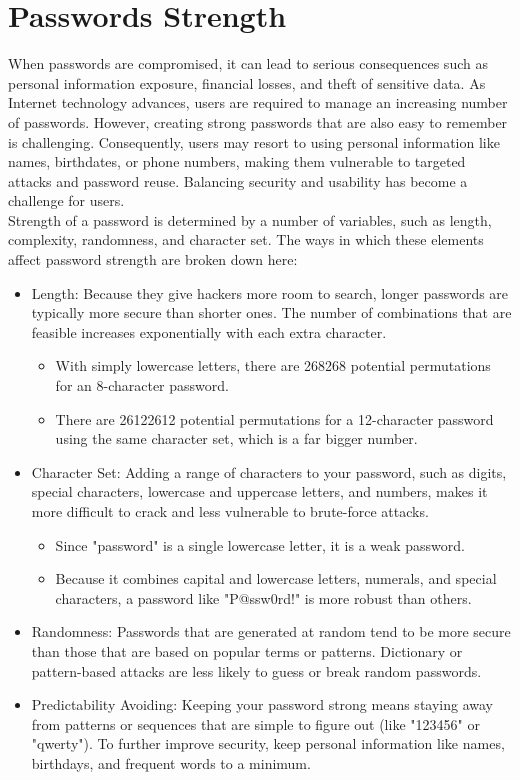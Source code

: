 \documentclass[10pt,oneside,english,a4paper]{article}
\begin{document}
\section{Passwords Strength}
When passwords are compromised, it can lead to serious consequences such as personal information exposure, financial losses, and theft of sensitive data. As Internet technology advances, users are required to manage an increasing number of passwords. However, creating strong passwords that are also easy to remember is challenging. Consequently, users may resort to using personal information like names, birthdates, or phone numbers, making them vulnerable to targeted attacks and password reuse. Balancing security and usability has become a challenge for users.\\
Strength of a password is determined by a number of variables, such as length, complexity, randomness, and character set. 
The ways in which these elements affect password strength are broken down here:
\begin{itemize}
\item Length: Because they give hackers more room to search, longer passwords are typically more secure than shorter ones. 
The number of combinations that are feasible increases exponentially with each extra character. 
\begin{itemize}
        \item With simply lowercase letters, there are 268268 potential permutations for an 8-character password.
        \item There are 26122612 potential permutations for a 12-character password using the same character set, which is a far bigger number.
\end{itemize}


\item Character Set: Adding a range of characters to your password, such as digits, special characters, lowercase and uppercase letters, and numbers, makes it more difficult to crack and less vulnerable to brute-force attacks.
\begin{itemize}  
	\item Since "password" is a single lowercase letter, it is a weak password.
	\item Because it combines capital and lowercase letters, numerals, and special characters, a password like "P@ssw0rd!" is more robust than others.
\end{itemize}

\item Randomness: Passwords that are generated at random tend to be more secure than those that are based on popular terms or patterns. Dictionary or pattern-based attacks are less likely to guess or break random passwords.

\item Predictability Avoiding: Keeping your password strong means staying away from patterns or sequences that are simple to figure out (like "123456" or "qwerty"). To further improve security, keep personal information like names, birthdays, and frequent words to a minimum.
\end{itemize}
\end{document}
